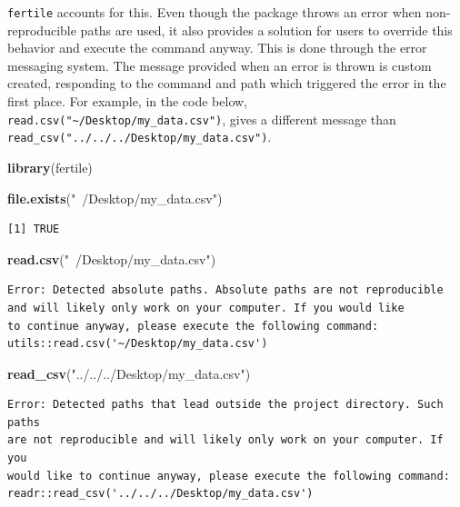\documentclass[12pt,twoside]{reedthesis}
\newenvironment{Shaded}{\begin{snugshade}}{\end{snugshade}}
\newcommand{\KeywordTok}[1]{\textcolor[rgb]{0.13,0.29,0.53}{\textbf{#1}}}
\newcommand{\NormalTok}[1]{#1}
\newcommand{\StringTok}[1]{\textcolor[rgb]{0.31,0.60,0.02}{#1}}
\begin{document}
\texttt{fertile} accounts for this. Even though the package throws an error when non-reproducible paths are used, it also provides a solution for users to override this behavior and execute the command anyway. This is done through the error messaging system. The message provided when an error is thrown is custom created, responding to the command and path which triggered the error in the first place. For example, in the code below, \texttt{read.csv("\textasciitilde{}/Desktop/my\_data.csv")}, gives a different message than \texttt{read\_csv("../../../Desktop/my\_data.csv")}.
\begin{Shaded}
\begin{Highlighting}[]
\KeywordTok{library}\NormalTok{(fertile)}
\end{Highlighting}
\end{Shaded}
\begin{Shaded}
\begin{Highlighting}[]
\KeywordTok{file.exists}\NormalTok{(}\StringTok{"~/Desktop/my_data.csv"}\NormalTok{)}
\end{Highlighting}
\end{Shaded}
\begin{verbatim}
[1] TRUE
\end{verbatim}
\begin{Shaded}
\begin{Highlighting}[]
\KeywordTok{read.csv}\NormalTok{(}\StringTok{"~/Desktop/my_data.csv"}\NormalTok{)}
\end{Highlighting}
\end{Shaded}
\begin{verbatim}
Error: Detected absolute paths. Absolute paths are not reproducible
and will likely only work on your computer. If you would like
to continue anyway, please execute the following command:
utils::read.csv('~/Desktop/my_data.csv')
\end{verbatim}
\begin{Shaded}
\begin{Highlighting}[]
\KeywordTok{read_csv}\NormalTok{(}\StringTok{"../../../Desktop/my_data.csv"}\NormalTok{)}
\end{Highlighting}
\end{Shaded}
\begin{verbatim}
Error: Detected paths that lead outside the project directory. Such paths
are not reproducible and will likely only work on your computer. If you
would like to continue anyway, please execute the following command:
readr::read_csv('../../../Desktop/my_data.csv')
\end{verbatim}
\end{document}
